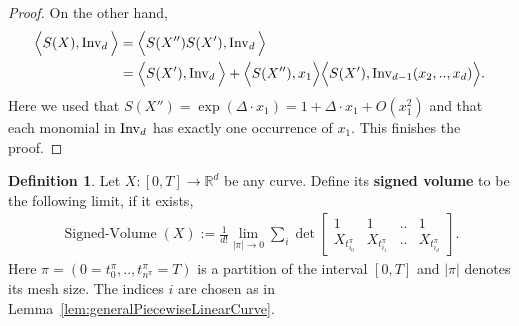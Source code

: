 \documentclass{scrartcl}
\theoremstyle{plain}
\theoremstyle{definition}
\newtheorem{definition}[theorem]{Definition}
\newcommand{\R}{\mathbb{R}}
\newcommand{\1}[1]{1_{\{#1\}}}
\newcommand{\ds}{d} %
\begin{document}
\begin{proof}
  On the other hand,
  \begin{align*}
    \Big\langle S(X), \firstInvariant{\ds} \Big\rangle 
    &=
    \Big\langle S(X'') S(X'), \firstInvariant{\ds} \Big\rangle \\
    &=
    \Big\langle S(X'), \firstInvariant{\ds} \Big\rangle
    +
    \Big\langle S(X''), x_1 \Big\rangle
    \Big\langle S(X'), \firstInvariant{\ds-1}(x_2, .., x_\ds) \Big\rangle.
  \end{align*}
  Here we used that $S(X'') = \exp( \Delta \cdot x_1 ) = 1 + \Delta \cdot x_1 + O(x_1^2)$
  and that each monomial in $\firstInvariant{\ds}$ has exactly one occurrence of $x_1$.
  This finishes the proof.
\end{proof}






\begin{definition}	
	Let $X: [0,T] \to \R^\ds$ be any curve.
	Define its \textbf{signed volume} to be the following limit, if it exists,
	\begin{align*}
	  \operatorname{Signed-Volume}(X)
	  :=
    \frac{1}{\ds!}
    \lim_{|\pi| \to 0}
    \sum_i
     \det\left[
       \begin{matrix}
         1 & 1 & .. & 1 \\
         X_{t^\pi_{i_0}} & X_{t^\pi_{i_1}} & .. & X_{t^\pi_{i_\ds}}
       \end{matrix}
     \right].
	\end{align*}
  Here $\pi = (0=t^\pi_0, .., t^\pi_{n^\pi}=T)$ is a partition of the interval $[0,T]$ and $|\pi|$ denotes its mesh size.
  The indices $i$ are chosen as in Lemma~\ref{lem:generalPiecewiseLinearCurve}.
\end{definition}
\end{document}
